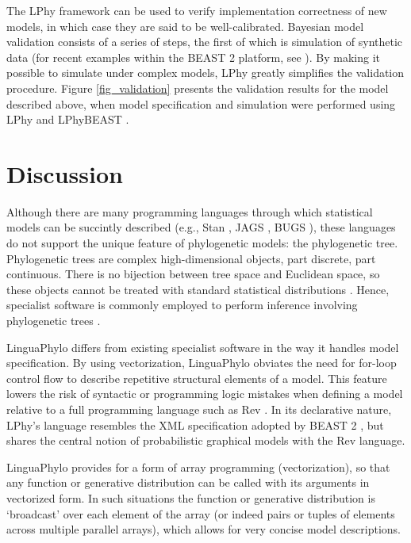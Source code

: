 \documentclass[10pt,letterpaper,table]{article}
\theoremstyle{definition}
\begin{document}
\noindent The LPhy framework can be used to verify implementation correctness of new models, in which case they are said to be well-calibrated.
Bayesian model validation consists of a series of steps, the first of which is simulation of synthetic data (for recent examples within the BEAST 2 platform, see \cite{gaboriau20,chen2022accounting}). 
By making it possible to simulate under complex models, LPhy greatly simplifies the validation procedure.
Figure \ref{fig_validation} presents the validation results for the model described above, when model specification and simulation were performed using LPhy and LPhyBEAST \cite{chen2022accounting}.

\section*{Discussion}
Although there are many
programming languages through which statistical 
models can be succintly described (e.g., Stan
\cite{carpenter2017stan}, JAGS \cite{plummer2003jags}, BUGS
\cite{lunn2009bugs, gilks1994language}), these languages do not
support the unique feature of phylogenetic models: the phylogenetic
tree.
Phylogenetic trees are complex high-dimensional objects, part
discrete, part continuous.
There is no bijection between tree space and Euclidean space, so these
objects cannot be treated with standard statistical distributions \cite{gavryushkin2016space}.
Hence, specialist software is commonly employed to perform inference
involving phylogenetic trees
\cite{hohna2016revbayes,bouckaert2019beastanalysis}.

LinguaPhylo differs from existing specialist software in the way it handles model specification.
By using vectorization, LinguaPhylo obviates the need for for-loop control flow to describe repetitive structural elements of a model.
This feature lowers the risk of syntactic or programming logic mistakes when defining a model relative to a full programming language such as Rev \cite{revbayes}.
In its declarative nature, LPhy's language resembles the XML specification adopted by BEAST 2 \cite{bouckaert2014beast}, but shares the central notion of probabilistic graphical models with the Rev language.

LinguaPhylo provides for a form of array programming (vectorization), so that any function or
generative distribution can be called with its arguments in
vectorized form. In such situations the function or generative distribution is `broadcast' over each element of the array (or indeed pairs or tuples of elements across multiple parallel arrays), which allows for very concise model descriptions.
\end{document}
